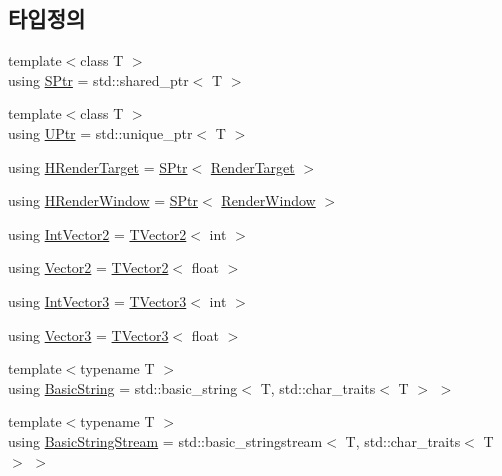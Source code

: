 \subsection*{타입정의}
\begin{DoxyCompactItemize}
\item 
{\footnotesize template$<$class T $>$ }\\using \hyperlink{namespacecpf_a91e72db639307e12a24546a0eebb1a42}{S\+Ptr} = std\+::shared\+\_\+ptr$<$ T $>$
\item 
{\footnotesize template$<$class T $>$ }\\using \hyperlink{namespacecpf_ae8ac5e55927cc357960f1d47c19fe0b9}{U\+Ptr} = std\+::unique\+\_\+ptr$<$ T $>$
\item 
using \hyperlink{namespacecpf_a3f0ea2ea743b0adb7c12e52131d485b5}{H\+Render\+Target} = \hyperlink{namespacecpf_a91e72db639307e12a24546a0eebb1a42}{S\+Ptr}$<$ \hyperlink{classcpf_1_1_render_target}{Render\+Target} $>$
\item 
using \hyperlink{namespacecpf_af5ffcc39bb6465427fc3b91366c917f6}{H\+Render\+Window} = \hyperlink{namespacecpf_a91e72db639307e12a24546a0eebb1a42}{S\+Ptr}$<$ \hyperlink{classcpf_1_1_render_window}{Render\+Window} $>$
\item 
using \hyperlink{namespacecpf_a2f1e39acef158fd0946044e6ea9547fe}{Int\+Vector2} = \hyperlink{classcpf_1_1_t_vector2}{T\+Vector2}$<$ int $>$
\item 
using \hyperlink{namespacecpf_a53b08b8672bd40979ad59ad208cc9970}{Vector2} = \hyperlink{classcpf_1_1_t_vector2}{T\+Vector2}$<$ float $>$
\item 
using \hyperlink{namespacecpf_a4308e51999664b7c52e0a33d6e6af1a6}{Int\+Vector3} = \hyperlink{classcpf_1_1_t_vector3}{T\+Vector3}$<$ int $>$
\item 
using \hyperlink{namespacecpf_a50675f369f5384c7543c7672e3441ba0}{Vector3} = \hyperlink{classcpf_1_1_t_vector3}{T\+Vector3}$<$ float $>$
\item 
{\footnotesize template$<$typename T $>$ }\\using \hyperlink{namespacecpf_ac91c8c57a370a5bef21ac23f876ad536}{Basic\+String} = std\+::basic\+\_\+string$<$ T, std\+::char\+\_\+traits$<$ T $>$ $>$
\item 
{\footnotesize template$<$typename T $>$ }\\using \hyperlink{namespacecpf_a1fe334b3d2422535a1cfe51785d98cb8}{Basic\+String\+Stream} = std\+::basic\+\_\+stringstream$<$ T, std\+::char\+\_\+traits$<$ T $>$ $>$
\item 

\end{DoxyCompactItemize}
